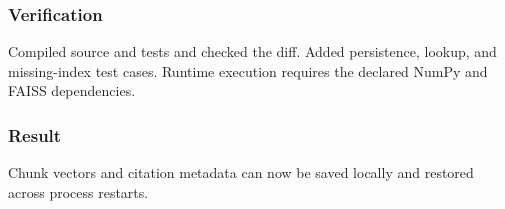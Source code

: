 \subsubsection{Verification}

Compiled source and tests and checked the diff. Added persistence, lookup, and missing-index test cases. Runtime execution requires the declared NumPy and FAISS dependencies.

\subsubsection{Result}

Chunk vectors and citation metadata can now be saved locally and restored across process restarts.

